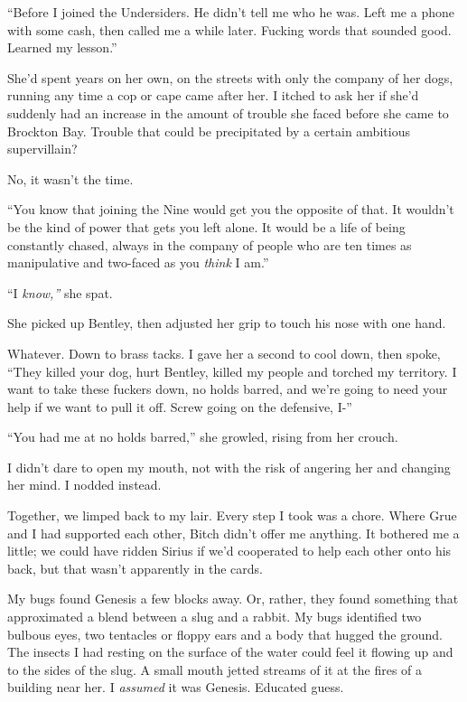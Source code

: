 ``Before I joined the Undersiders.  He didn't tell me who he was.  Left me a phone with some cash, then called me a while later.  Fucking words that sounded good.  Learned my lesson.''



She'd spent years on her own, on the streets with only the company of her dogs, running any time a cop or cape came after her.  I itched to ask her if she'd suddenly had an increase in the amount of trouble she faced before she came to Brockton Bay.  Trouble that could be precipitated by a certain ambitious supervillain?



No, it wasn't the time.



``You know that joining the Nine would get you the opposite of that.  It wouldn't be the kind of power that gets you left alone.  It would be a life of being constantly chased, always in the company of people who are ten times as manipulative and two-faced as you \emph{think} I am.''



``I \emph{know,'' }she spat.



She picked up Bentley, then adjusted her grip to touch his nose with one hand.



Whatever.  Down to brass tacks.  I gave her a second to cool down, then spoke, ``They killed your dog, hurt Bentley, killed my people and torched my territory.  I want to take these fuckers down, no holds barred, and we're going to need your help if we want to pull it off.  Screw going on the defensive, I-''



``You had me at no holds barred,'' she growled, rising from her crouch.



I didn't dare to open my mouth, not with the risk of angering her and changing her mind.  I nodded instead.



Together, we limped back to my lair.  Every step I took was a chore.  Where Grue and I had supported each other, Bitch didn't offer me anything.  It bothered me a little; we could have ridden Sirius if we'd cooperated to help each other onto his back, but that wasn't apparently in the cards.



My bugs found Genesis a few blocks away.  Or, rather, they found something that approximated a blend between a slug and a rabbit.  My bugs identified two bulbous eyes, two tentacles or floppy ears and a body that hugged the ground.  The insects I had resting on the surface of the water could feel it flowing up and to the sides of the slug.  A small mouth jetted streams of it at the fires of a building near her.  I \emph{assumed} it was Genesis.  Educated guess.



